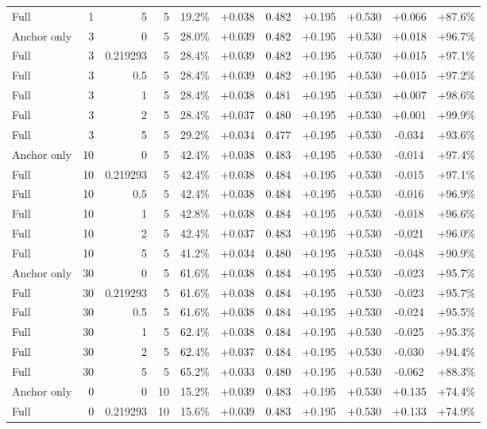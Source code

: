\begin{table}[htbp]
\begin{tabular}{lrrrccccccc}
Full & 1 & 5 & 5 & 19.2\% & +0.038 & 0.482 & +0.195 & +0.530 & +0.066 & +87.6\% \\
Anchor only & 3 & 0 & 5 & 28.0\% & +0.039 & 0.482 & +0.195 & +0.530 & +0.018 & +96.7\% \\
Full & 3 & 0.219293 & 5 & 28.4\% & +0.039 & 0.482 & +0.195 & +0.530 & +0.015 & +97.1\% \\
Full & 3 & 0.5 & 5 & 28.4\% & +0.039 & 0.482 & +0.195 & +0.530 & +0.015 & +97.2\% \\
Full & 3 & 1 & 5 & 28.4\% & +0.038 & 0.481 & +0.195 & +0.530 & +0.007 & +98.6\% \\
Full & 3 & 2 & 5 & 28.4\% & +0.037 & 0.480 & +0.195 & +0.530 & +0.001 & +99.9\% \\
Full & 3 & 5 & 5 & 29.2\% & +0.034 & 0.477 & +0.195 & +0.530 & -0.034 & +93.6\% \\
Anchor only & 10 & 0 & 5 & 42.4\% & +0.038 & 0.483 & +0.195 & +0.530 & -0.014 & +97.4\% \\
Full & 10 & 0.219293 & 5 & 42.4\% & +0.038 & 0.484 & +0.195 & +0.530 & -0.015 & +97.1\% \\
Full & 10 & 0.5 & 5 & 42.4\% & +0.038 & 0.484 & +0.195 & +0.530 & -0.016 & +96.9\% \\
Full & 10 & 1 & 5 & 42.8\% & +0.038 & 0.484 & +0.195 & +0.530 & -0.018 & +96.6\% \\
Full & 10 & 2 & 5 & 42.4\% & +0.037 & 0.483 & +0.195 & +0.530 & -0.021 & +96.0\% \\
Full & 10 & 5 & 5 & 41.2\% & +0.034 & 0.480 & +0.195 & +0.530 & -0.048 & +90.9\% \\
Anchor only & 30 & 0 & 5 & 61.6\% & +0.038 & 0.484 & +0.195 & +0.530 & -0.023 & +95.7\% \\
Full & 30 & 0.219293 & 5 & 61.6\% & +0.038 & 0.484 & +0.195 & +0.530 & -0.023 & +95.7\% \\
Full & 30 & 0.5 & 5 & 61.6\% & +0.038 & 0.484 & +0.195 & +0.530 & -0.024 & +95.5\% \\
Full & 30 & 1 & 5 & 62.4\% & +0.038 & 0.484 & +0.195 & +0.530 & -0.025 & +95.3\% \\
Full & 30 & 2 & 5 & 62.4\% & +0.037 & 0.484 & +0.195 & +0.530 & -0.030 & +94.4\% \\
Full & 30 & 5 & 5 & 65.2\% & +0.033 & 0.480 & +0.195 & +0.530 & -0.062 & +88.3\% \\
Anchor only & 0 & 0 & 10 & 15.2\% & +0.039 & 0.483 & +0.195 & +0.530 & +0.135 & +74.4\% \\
Full & 0 & 0.219293 & 10 & 15.6\% & +0.039 & 0.483 & +0.195 & +0.530 & +0.133 & +74.9\% \\

\end{tabular}
\end{table}

